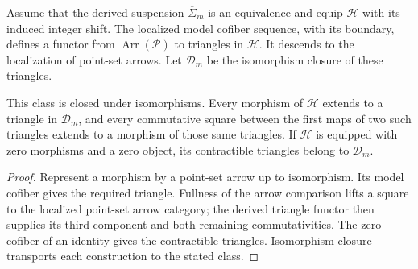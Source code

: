 \begin{theorem}
\label{sem:AdamsSynthetic:model-cofiber-triangles}
\label{sem:AdamsSynthetic:model-cofiber-tr1-tr3}
Assume that the derived suspension $\overline\Sigma_m$ is an
equivalence and equip $\mathcal H$ with its induced integer shift.
The localized model cofiber sequence, with its boundary, defines
a functor from $\operatorname{Arr}(\mathcal P)$ to triangles in
$\mathcal H$. It descends to the localization of point-set arrows.
Let $\mathcal D_m$ be the isomorphism closure of these triangles.

This class is closed under isomorphisms. Every morphism
of $\mathcal H$ extends to a triangle in $\mathcal D_m$, and every
commutative square between the first maps of two such triangles extends
to a morphism of those same triangles. If $\mathcal H$ is equipped
with zero morphisms and a zero object, its contractible triangles
belong to $\mathcal D_m$.
\end{theorem}
\begin{proof}
Represent a morphism by a point-set arrow up to isomorphism.
Its model cofiber gives the required triangle. Fullness of the arrow
comparison lifts a square to the localized point-set arrow category;
the derived triangle functor then supplies its third component and
both remaining commutativities. The zero cofiber of an identity gives
the contractible triangles. Isomorphism closure transports each
construction to the stated class.
\end{proof}


